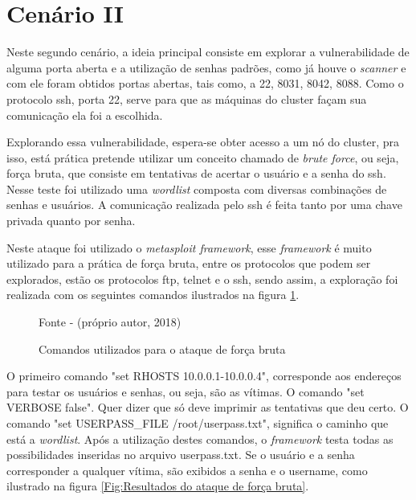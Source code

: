 \newpage
\section{Cenário II}

Neste segundo cenário, a ideia principal consiste em explorar a vulnerabilidade de alguma porta aberta e a utilização de senhas padrões, como já houve o \textit{scanner} e com ele foram obtidos portas abertas, tais como, a 22, 8031, 8042, 8088. Como o protocolo ssh, porta 22, serve para que as máquinas do cluster façam sua comunicação ela foi a escolhida.

Explorando essa vulnerabilidade, espera-se obter acesso a um nó do cluster, pra isso, está prática pretende utilizar um conceito chamado de \textit{brute force}, ou seja, força bruta, que consiste em tentativas de acertar o usuário e a senha do ssh. Nesse teste foi utilizado uma \textit{wordlist} composta com diversas combinações de senhas e usuários. A comunicação realizada pelo ssh é feita tanto por uma chave privada quanto por senha.

Neste ataque foi utilizado o \textit{metasploit framework}, esse \textit{framework} é muito utilizado para a prática de força bruta, entre os protocolos que podem ser explorados, estão os protocolos ftp, telnet e o ssh, sendo assim, a exploração foi realizada com os seguintes comandos ilustrados na figura \ref{Fig:Comandos utilizados para o ataque de força bruta}. 

\begin{figure}[htbp!] \begin{center}
\caption{Comandos utilizados para o ataque de força bruta}
\small{Fonte - (próprio autor, 2018)}
\label{Fig:Comandos utilizados para o ataque de força bruta}
\end{center} \end{figure}

O primeiro comando "set RHOSTS 10.0.0.1-10.0.0.4", corresponde aos endereços para testar os usuários e senhas, ou seja, são as vítimas. O comando "set VERBOSE false". Quer dizer que só deve imprimir as tentativas que deu certo. O comando "set USERPASS\_FILE /root/userpass.txt", significa o caminho que está a \textit{wordlist}. Após a utilização destes comandos, o \textit{framework} testa todas as possibilidades inseridas no arquivo userpass.txt. Se o usuário e a senha corresponder a qualquer vítima, são exibidos a senha e o username, como ilustrado na figura \ref{Fig:Resultados do ataque de força bruta}.

